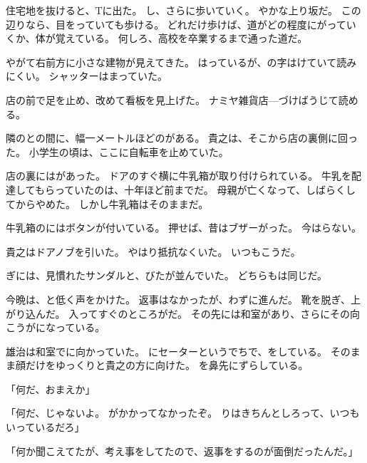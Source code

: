 \documentclass[chapter3.tex]{subfiles}
\begin{document}
\begin{CJK}{UTF8}{ipxm}
    住宅地を抜けると、Tに出た。
    し、さらに歩いていく。
    やかな上り坂だ。
    この辺りなら、目をっていても歩ける。
    どれだけ歩けば、道がどの程度にがっていくか、体が覚えている。
    何しろ、高校を卒業するまで通った道だ。

    やがて右前方に小さな建物が見えてきた。
    はっているが、の字はけていて読みにくい。
    シャッターはまっていた。

    店の前で足を止め、改めて看板を見上げた。
    ナミヤ雑貨店---づけばうじて読める。

    隣のとの間に、幅一メートルほどのがある。
    貴之は、そこから店の裏側に回った。
    小学生の頃は、ここに自転車を止めていた。

    店の裏にはがあった。
    ドアのすぐ横に牛乳箱が取り付けられている。
    牛乳を配達してもらっていたのは、十年ほど前までだ。
    母親が亡くなって、しばらくしてからやめた。
    しかし牛乳箱はそのままだ。

    牛乳箱のにはボタンが付いている。
    押せば、昔はブザーがった。
    今はらない。

    貴之はドアノブを引いた。
    やはり抵抗なくいた。
    いつもこうだ。

    ぎには、見慣れたサンダルと、びたが並んでいた。
    どちらもは同じだ。

    今晩は、と低く声をかけた。
    返事はなかったが、わずに進んだ。
    靴を脱ぎ、上がり込んだ。
    入ってすぐのところがだ。
    その先には和室があり、さらにその向こうがになっている。

    雄治は和室でに向かっていた。
    にセーターというでちで、をしている。
    そのまま顔だけをゆっくりと貴之の方に向けた。
    を鼻先にずらしている。

    「何だ、おまえか」

    「何だ、じゃないよ。
    がかかってなかったぞ。
    りはきちんとしろって、いつもいっているだろ」

    「何か聞こえてたが、考え事をしてたので、返事をするのが面倒だったんだ。」


\end{CJK}
\end{document}
